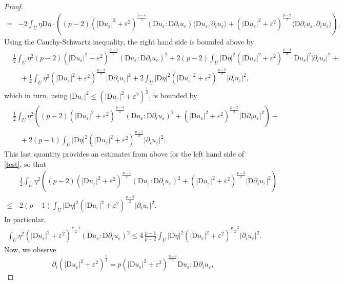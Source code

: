 \documentclass[a4paper,11pt]{article}
\numberwithin{equation}{section}
\newcommand{\eps}{\varepsilon}
\newcommand{\rom}{\mathrm}
\theoremstyle{definition}
\begin{document}
\begin{proof}
\begin{equation}
\begin{aligned}
=&-2\int_U\eta \rom D\eta\cdot\left((p-2)\left(|\rom Du_\eps|^2+\eps^2\right)^{\frac{p-4}2}(\rom Du_\eps:\rom D\partial_i u_\eps)\langle\rom Du_\eps,\partial_iu_\eps\rangle+\left(|\rom Du_\eps|^2+\eps^2\right)^{\frac{p-2}2}\langle\rom D\partial _iu_\eps,\partial_iu_\eps\rangle\right).
\end{aligned}
\end{equation}
Using the Cauchy-Schwartz inequality, the right hand side is bounded above by
\begin{align*}
&\frac12\int_U\eta^2(p-2)\left(|\rom Du_\eps|^2+\eps^2\right)^{\frac{p-4}2}(\rom Du_\eps:\rom D\partial_i u_\eps)^2+2(p-2)\int_U|\rom D\eta|^2\left(|\rom Du_\eps|^2+\eps^2\right)^{\frac{p-4}2}|\rom Du_\eps|^2|\partial_iu_\eps|^2+\\
&\quad+\frac12\int_U\eta^2\left(|\rom Du_\eps|^2+\eps^2\right)^{\frac{p-2}2}|\rom D\partial_i u_\eps|^2+2\int_U|\rom D\eta|^2\left(|\rom Du_\eps|^2+\eps^2\right)^{\frac{p-2}2}|\partial_iu_\eps|^2,
\end{align*}
which in turn, using $|\rom Du_\eps|^2\leq\left(|\rom Du_\eps|^2+\eps^2\right)^{\frac12}$, is bounded by
\begin{align*}
&\frac12\int_U\eta^2\left((p-2)\left(|\rom Du_\eps|^2+\eps^2\right)^{\frac{p-4}2}(\rom Du_\eps:\rom D\partial_i u_\eps)^2+\left(|\rom Du_\eps|^2+\eps^2\right)^{\frac{p-2}2}|\rom D\partial_i u_\eps|^2\right)+\\
&\quad+2(p-1)\int_U|\rom D\eta|^2\left(|\rom Du_\eps|^2+\eps^2\right)^{\frac{p-2}2}|\partial_iu_\eps|^2.
\end{align*}
This last quantity provides an estimates from above for the left hand side of \eqref{test}, so that
\begin{align*}
&\frac12\int_U\eta^2\left((p-2)\left(|\rom Du_\eps|^2+\eps^2\right)^{\frac{p-4}2}(\rom Du_\eps:\rom D\partial_i u_\eps)^2+\left(|\rom Du_\eps|^2+\eps^2\right)^{\frac{p-2}2}|\rom D\partial_i u_\eps|^2\right)\\
\leq\,&2(p-1)\int_U|\rom D\eta|^2\left(|\rom Du_\eps|^2+\eps^2\right)^{\frac{p-2}2}|\partial_iu_\eps|^2.
\end{align*}
In particular,
\begin{align*}
\int_U\eta^2\left(|\rom Du_\eps|^2+\eps^2\right)^{\frac{p-4}2}(\rom Du_\eps:\rom D\partial_i u_\eps)^2
\leq4\,\frac{p-1}{p-2}\int_U|\rom D\eta|^2\left(|\rom Du_\eps|^2+\eps^2\right)^{\frac{p-2}2}|\partial_iu_\eps|^2.
\end{align*}
Now, we observe
$$
\partial_i \left(|\rom Du_\eps|^2+\eps^2\right)^{\frac p4}=p\left(|\rom Du_\eps|^2+\eps^2\right)^{\frac{p-4}4}\rom Du_\eps:\rom D\partial_iu_\eps,
$$
\end{proof}
\end{document}
